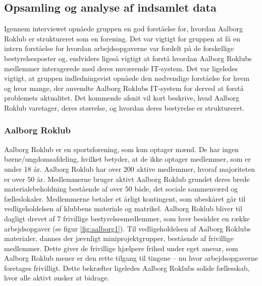 \subsection{Opsamling og analyse af indsamlet data} 
Igennem interviewet opnåede gruppen en god forståelse for, hvordan Aalborg Roklub er struktureret som en forening. Det var vigtigt for gruppen at få en intern forståelse for hvordan arbejdsopgaverne var fordelt på de forskellige bestyrelsesposter og, endvidere ligeså vigtigt at forstå hvordan Aalborg Roklubs medlemmer interagerede med deres nuværende IT-system. Det var ligeledes vigtigt, at gruppen indledningsvist opnåede den nødvendige forståelse for hvem og hvor mange, der anvendte Aalborg Roklubs IT-system for derved at forstå problemets aktualitet. Det kommende afsnit vil kort beskrive, hvad Aalborg Roklub varetager, deres størrelse, og hvordan deres bestyrelse er struktureret. \\

\subsubsection{Aalborg Roklub}
\label{sec:aalborg_robklub_organisation}
Aalborg Roklub er en sportsforening, som kun optager mænd. De har ingen børne/ungdomsafdeling, hvilket betyder, at de ikke optager medlemmer, som er under 18 år. Aalborg Roklub har over 200 aktive medlemmer, hvoraf majoriteten er over 50 år. Medlemmerne bruger aktivt Aalborg Roklub grundet deres brede materialebeholdning bestående af over 50 både, det sociale sammenværd og fælleslokaler. Medlemmerne betaler et årligt kontingent, som ubeskåret går til vedligeholdelsen af klubbens materiale og matrikel. Aalborg Roklub bliver til dagligt drevet af 7 frivillige bestyrelsesmedlemmer, som hver besidder en række arbejdsopgaver (se figur \ref{fig:aalborg1}).
Til vedligeholdelsen af Aalborg Roklubs materialer, dannes der jævnligt miniprojektgrupper, bestående af frivillige medlemmer. Dette giver de frivillige hjælpere frihed under eget ansvar, som Aalborg Roklub mener er den rette tilgang til tingene – nu hvor arbejdsopgaverne foretages frivilligt. Dette bekræfter ligeledes Aalborg Roklubs solide fællesskab, hvor alle aktivt ønsker at bidrage. 

